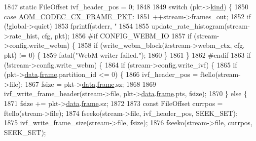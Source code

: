 \begin{DoxyCodeInclude}
{{{{{{{{{{{{{{{{{{{{{{{{{{{{{{{{{{{{1847     \textcolor{keyword}{static} FileOffset ivf\_header\_pos = 0;
1848 
1849     \textcolor{keywordflow}{switch} (pkt->\hyperlink{structaom__codec__cx__pkt_a11e586120c689ece9a7690e72ff384be}{kind}) \{
1850       \textcolor{keywordflow}{case} \hyperlink{group__encoder_ggafeb69da4a9649a54e805f59c26d8dfeda793165d0f219812342f69d5fd9b2b9c8}{AOM\_CODEC\_CX\_FRAME\_PKT}:
1851         ++stream->frames\_out;
1852         \textcolor{keywordflow}{if} (!global->quiet)
1853           fprintf(stderr, \textcolor{stringliteral}{" %
1854 
1855         update\_rate\_histogram(stream->rate\_hist, cfg, pkt);
1856 \textcolor{preprocessor}{#if CONFIG\_WEBM\_IO}
1857         \textcolor{keywordflow}{if} (stream->config.write\_webm) \{
1858           \textcolor{keywordflow}{if} (write\_webm\_block(&stream->webm\_ctx, cfg, pkt) != 0) \{
1859             fatal(\textcolor{stringliteral}{"WebM writer failed."});
1860           \}
1861         \}
1862 \textcolor{preprocessor}{#endif}
1863         \textcolor{keywordflow}{if} (!stream->config.write\_webm) \{
1864           \textcolor{keywordflow}{if} (stream->config.write\_ivf) \{
1865             \textcolor{keywordflow}{if} (pkt->\hyperlink{structaom__codec__cx__pkt_afb379cd4bfa7692d1d6e85f4e4b2b410}{data}.\hyperlink{structaom__codec__cx__pkt_a4180a6ae59b0d295bc915d4689df4cb0}{frame}.partition\_id <= 0) \{
1866               ivf\_header\_pos = ftello(stream->file);
1867               fsize = pkt->\hyperlink{structaom__codec__cx__pkt_afb379cd4bfa7692d1d6e85f4e4b2b410}{data}.\hyperlink{structaom__codec__cx__pkt_a4180a6ae59b0d295bc915d4689df4cb0}{frame}.sz;
1868 
1869               ivf\_write\_frame\_header(stream->file, pkt->\hyperlink{structaom__codec__cx__pkt_afb379cd4bfa7692d1d6e85f4e4b2b410}{data}.\hyperlink{structaom__codec__cx__pkt_a4180a6ae59b0d295bc915d4689df4cb0}{frame}.pts, fsize);
1870             \} \textcolor{keywordflow}{else} \{
1871               fsize += pkt->\hyperlink{structaom__codec__cx__pkt_afb379cd4bfa7692d1d6e85f4e4b2b410}{data}.\hyperlink{structaom__codec__cx__pkt_a4180a6ae59b0d295bc915d4689df4cb0}{frame}.sz;
1872 
1873               \textcolor{keyword}{const} FileOffset currpos = ftello(stream->file);
1874               fseeko(stream->file, ivf\_header\_pos, SEEK\_SET);
1875               ivf\_write\_frame\_size(stream->file, fsize);
1876               fseeko(stream->file, currpos, SEEK\_SET);
}}}}}}}}}}}}}}}}}}}}}}}}}}}}}}}}}}}}}
\end{DoxyCodeInclude}
